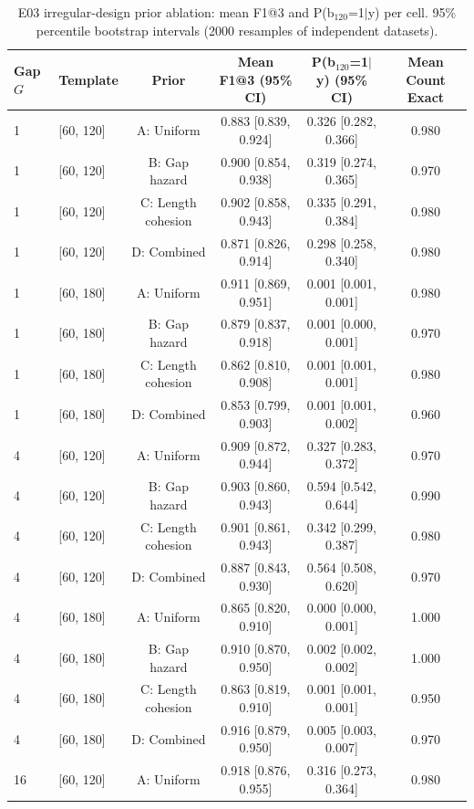 \begin{table}[!htbp]
\centering\small
\caption{E03 irregular-design prior ablation: mean F1@3 and P(b$_{120}$=1$|$y) per cell. 95\% percentile bootstrap intervals (2000 resamples of independent datasets).}
\label{tab:planned-E03-prior-paper}
\begin{tabular}{@{}llcccc@{}}
\toprule
Gap $G$ & Template & Prior & Mean F1@3 (95\% CI) & P(b$_{120}$=1$|$y) (95\% CI) & Mean Count Exact \\
\midrule
1 & [60, 120] & A: Uniform & 0.883 [0.839, 0.924] & 0.326 [0.282, 0.366] & 0.980 \\
1 & [60, 120] & B: Gap hazard & 0.900 [0.854, 0.938] & 0.319 [0.274, 0.365] & 0.970 \\
1 & [60, 120] & C: Length cohesion & 0.902 [0.858, 0.943] & 0.335 [0.291, 0.384] & 0.980 \\
1 & [60, 120] & D: Combined & 0.871 [0.826, 0.914] & 0.298 [0.258, 0.340] & 0.980 \\
1 & [60, 180] & A: Uniform & 0.911 [0.869, 0.951] & 0.001 [0.001, 0.001] & 0.980 \\
1 & [60, 180] & B: Gap hazard & 0.879 [0.837, 0.918] & 0.001 [0.000, 0.001] & 0.970 \\
1 & [60, 180] & C: Length cohesion & 0.862 [0.810, 0.908] & 0.001 [0.001, 0.001] & 0.980 \\
1 & [60, 180] & D: Combined & 0.853 [0.799, 0.903] & 0.001 [0.001, 0.002] & 0.960 \\
4 & [60, 120] & A: Uniform & 0.909 [0.872, 0.944] & 0.327 [0.283, 0.372] & 0.970 \\
4 & [60, 120] & B: Gap hazard & 0.903 [0.860, 0.943] & 0.594 [0.542, 0.644] & 0.990 \\
4 & [60, 120] & C: Length cohesion & 0.901 [0.861, 0.943] & 0.342 [0.299, 0.387] & 0.980 \\
4 & [60, 120] & D: Combined & 0.887 [0.843, 0.930] & 0.564 [0.508, 0.620] & 0.970 \\
4 & [60, 180] & A: Uniform & 0.865 [0.820, 0.910] & 0.000 [0.000, 0.001] & 1.000 \\
4 & [60, 180] & B: Gap hazard & 0.910 [0.870, 0.950] & 0.002 [0.002, 0.002] & 1.000 \\
4 & [60, 180] & C: Length cohesion & 0.863 [0.819, 0.910] & 0.001 [0.001, 0.001] & 0.950 \\
4 & [60, 180] & D: Combined & 0.916 [0.879, 0.950] & 0.005 [0.003, 0.007] & 0.970 \\
16 & [60, 120] & A: Uniform & 0.918 [0.876, 0.955] & 0.316 [0.273, 0.364] & 0.980 \\

\end{tabular}
\end{table}
